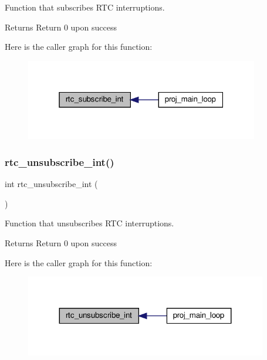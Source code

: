Function that subscribes R\+TC interruptions. 

\begin{DoxyReturn}{Returns}
Return 0 upon success 
\end{DoxyReturn}
Here is the caller graph for this function\+:
\nopagebreak
\begin{figure}[H]
\begin{center}
\leavevmode
\includegraphics[width=289pt]{group__rtc_gabd8de825e876e8ef94c64ac616f68a11_icgraph}
\end{center}
\end{figure}
\mbox{\label{group__rtc_gab8f17bf5280c908c8b199a90fefcc758}} 
\subsubsection{\texorpdfstring{rtc\+\_\+unsubscribe\+\_\+int()}{rtc\_unsubscribe\_int()}}
{\footnotesize\ttfamily int rtc\+\_\+unsubscribe\+\_\+int (\begin{DoxyParamCaption}{ }\end{DoxyParamCaption})}



Function that unsubscribes R\+TC interruptions. 

\begin{DoxyReturn}{Returns}
Return 0 upon success 
\end{DoxyReturn}
Here is the caller graph for this function\+:
\nopagebreak
\begin{figure}[H]
\begin{center}
\leavevmode
\includegraphics[width=299pt]{group__rtc_gab8f17bf5280c908c8b199a90fefcc758_icgraph}
\end{center}
\end{figure}
\mbox{\label{group__rtc_gade198e3189c6f8195cde4e404671f980}} 
